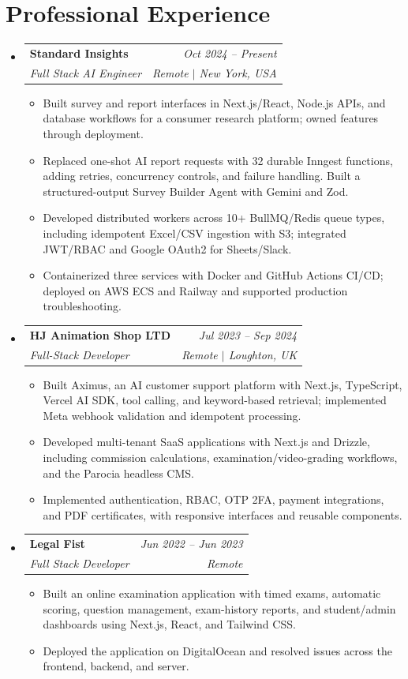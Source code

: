 \documentclass[letterpaper,11pt]{article}
\makeatletter
\newcommand{\resumeItem}[1]{
  \item\small{#1 \vspace{-1pt}}
}
\newcommand{\resumeSubheading}[4]{
  \vspace{-1pt}\item
    \begin{tabular*}{0.97\textwidth}[t]{l@{\extracolsep{\fill}}r}
      \textbf{#1} & \textit{\small #2} \\
      \textit{\small#3} & \textit{\small #4} \\
    \end{tabular*}\vspace{-6pt}
}
\newcommand{\resumeSubHeadingListStart}{\begin{itemize}[leftmargin=0.15in, label={}]}
\newcommand{\resumeSubHeadingListEnd}{\end{itemize}}
\newcommand{\resumeItemListStart}{\begin{itemize}[itemsep=1pt]}
\newcommand{\resumeItemListEnd}{\end{itemize}\vspace{-5pt}}
\makeatother
\begin{document}
\section{Professional Experience}
  \resumeSubHeadingListStart
    \resumeSubheading
      {Standard Insights}{Oct 2024 -- Present}
      {Full Stack AI Engineer}{Remote $|$ New York, USA}
      \resumeItemListStart
        \resumeItem{Built survey and report interfaces in Next.js/React, Node.js APIs, and database workflows for a consumer research platform; owned features through deployment.}
        \resumeItem{Replaced one-shot AI report requests with 32 durable Inngest functions, adding retries, concurrency controls, and failure handling. Built a structured-output Survey Builder Agent with Gemini and Zod.}
        \resumeItem{Developed distributed workers across 10+ BullMQ/Redis queue types, including idempotent Excel/CSV ingestion with S3; integrated JWT/RBAC and Google OAuth2 for Sheets/Slack.}
        \resumeItem{Containerized three services with Docker and GitHub Actions CI/CD; deployed on AWS ECS and Railway and supported production troubleshooting.}
      \resumeItemListEnd

    \resumeSubheading
      {HJ Animation Shop LTD}{Jul 2023 -- Sep 2024}
      {Full-Stack Developer}{Remote $|$ Loughton, UK}
      \resumeItemListStart
        \resumeItem{Built Aximus, an AI customer support platform with Next.js, TypeScript, Vercel AI SDK, tool calling, and keyword-based retrieval; implemented Meta webhook validation and idempotent processing.}
        \resumeItem{Developed multi-tenant SaaS applications with Next.js and Drizzle, including commission calculations, examination/video-grading workflows, and the Parocia headless CMS.}
        \resumeItem{Implemented authentication, RBAC, OTP 2FA, payment integrations, and PDF certificates, with responsive interfaces and reusable components.}
      \resumeItemListEnd

    \resumeSubheading
      {Legal Fist}{Jun 2022 -- Jun 2023}
      {Full Stack Developer}{Remote}
      \resumeItemListStart
        \resumeItem{Built an online examination application with timed exams, automatic scoring, question management, exam-history reports, and student/admin dashboards using Next.js, React, and Tailwind CSS.}
        \resumeItem{Deployed the application on DigitalOcean and resolved issues across the frontend, backend, and server.}
      \resumeItemListEnd
  \resumeSubHeadingListEnd

\newpage
\end{document}
